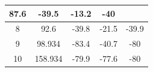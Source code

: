 \documentclass[UTF8,10pt,a4paper,fontset=fandol]{ctexart}
\newcommand{\fieldvalue}[1]{#1}
\begin{document}
\begin{center}
\begin{tabular}{|c|c|c|c|c|}
\fieldvalue{87.6} &
\fieldvalue{-39.5} &
\fieldvalue{-13.2} &
\fieldvalue{-40}\\
\hline
8 &
\fieldvalue{92.6} &
\fieldvalue{-39.8} &
\fieldvalue{-21.5} &
\fieldvalue{-39.9}\\
\hline
9 &
\fieldvalue{98.934} &
\fieldvalue{-83.4} &
\fieldvalue{-40.7} &
\fieldvalue{-80}\\
\hline
10 &
\fieldvalue{158.934} &
\fieldvalue{-79.9} &
\fieldvalue{-77.6} &
\fieldvalue{-80}\\
\hline
\end{tabular}
\end{center}
\end{document}
